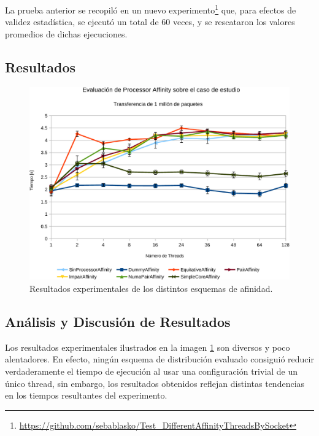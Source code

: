 La prueba anterior se recopiló en un nuevo experimento\footnote{\url{https://github.com/sebablasko/Test_DifferentAffinityThreadsBySocket}} que, para efectos de validez estadística, se ejecutó un total de 60 veces, y se rescataron los valores promedios de dichas ejecuciones.

\subsection{Resultados}

\begin{figure}[!h]
	\centering
	\includegraphics[scale=.6]{resultados/processoraffinity-crop.pdf}
	\caption{Resultados experimentales de los distintos esquemas de afinidad.}
	\label{fig:resAffinity}
\end{figure}

\subsection{Análisis y Discusión de Resultados}
Los resultados experimentales ilustrados en la imagen \ref{fig:resAffinity} son diversos y poco alentadores. En efecto, ningún esquema de distribución evaluado consiguió reducir verdaderamente el tiempo de ejecución al usar una configuración trivial de un único thread, sin embargo, los resultados obtenidos reflejan distintas tendencias en los tiempos resultantes del experimento.

